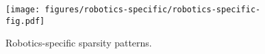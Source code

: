 
\begin{figure}[htbp]
    \centering
    \texttt{[image: figures/robotics-specific/robotics-specific-fig.pdf]}
    \caption{Robotics-specific sparsity patterns.
    \label{fig:rs:robotics-specific}}
    \vspace{-6mm}
\end{figure}